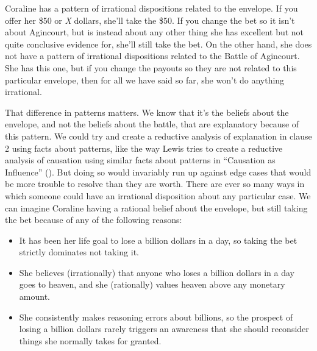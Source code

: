 \documentclass[
  12pt,
  letterpaper,
]{scrbook}
\providecommand{\tightlist}{%
  \setlength{\itemsep}{0pt}\setlength{\parskip}{0pt}}\usepackage{longtable,booktabs,array}
\begin{document}
Coraline has a pattern of irrational dispositions related to the
envelope. If you offer her \$50 or \emph{X} dollars, she'll take the
\$50. If you change the bet so it isn't about Agincourt, but is instead
about any other thing she has excellent but not quite conclusive
evidence for, she'll still take the bet. On the other hand, she does not
have a pattern of irrational dispositions related to the Battle of
Agincourt. She has this one, but if you change the payouts so they are
not related to this particular envelope, then for all we have said so
far, she won't do anything irrational.

That difference in patterns matters. We know that it's the beliefs about
the envelope, and not the beliefs about the battle, that are explanatory
because of this pattern. We could try and create a reductive analysis of
explanation in clause 2 using facts about patterns, like the way Lewis
tries to create a reductive analysis of causation using similar facts
about patterns in ``Causation as Influence''
(). But doing so would invariably
run up against edge cases that would be more trouble to resolve than
they are worth. There are ever so many ways in which someone could have
an irrational disposition about any particular case. We can imagine
Coraline having a rational belief about the envelope, but still taking
the bet because of any of the following reasons:

\begin{itemize}
\tightlist
\item
  It has been her life goal to lose a billion dollars in a day, so
  taking the bet strictly dominates not taking it.
\item
  She believes (irrationally) that anyone who loses a billion dollars in
  a day goes to heaven, and she (rationally) values heaven above any
  monetary amount.
\item
  She consistently makes reasoning errors about billions, so the
  prospect of losing a billion dollars rarely triggers an awareness that
  she should reconsider things she normally takes for granted.
\end{itemize}
\end{document}
